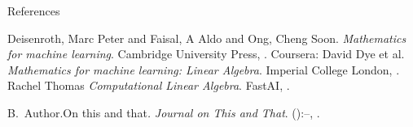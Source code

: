 
\begin{frame}{References}
	\begin{thebibliography}{2}
		\beamertemplatebookbibitems
		Deisenroth, Marc Peter and Faisal, A Aldo and Ong, Cheng Soon. \newblock\emph{Mathematics for machine learning}.\newblock
\textlatin{Cambridge University Press, 
}.
\beamertemplatebookbibitems
		Coursera: David Dye et al. \newblock\emph{Mathematics for machine learning: Linear Algebra}.\newblock
\textlatin{Imperial College London, 
}.
\beamertemplatebookbibitems
		Rachel Thomas \newblock\emph{Computational Linear Algebra}.\newblock
\textlatin{FastAI, 
}.

		\beamertemplatearticlebibitems
		B.\ Author.\newblock On this and that\emph{.}
\newblock\emph{Journal on This and That}. 
():--, 
.
	\end{thebibliography}
\end{frame}